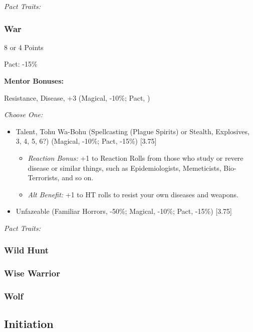 \begin{multicols}{3}
	\textit{Pact Traits:} 
	
	\subsubsection{War}
	\begin{flushright}
		8 or 4 Points
	\end{flushright}
	Pact: -15\%
	
	
	\textbf{Mentor Bonuses:} 
	
	Resistance, Disease, +3 (Magical, -10\%; Pact, )
	
	\textit{Choose One:}
	\begin{itemize}
		\itemsep 0pt
		\item Talent, Tohu Wa-Bohu (Spellcasting (Plague Spirits) or Stealth, Explosives, 3, 4, 5, 6?) (Magical, -10\%; Pact, -15\%) [3.75]
		\begin{itemize}
			\itemsep 0pt
			\item \textit{Reaction Bonus:} +1 to Reaction Rolls from those who study or revere disease or similar things, such as Epidemiologists, Memeticists, Bio-Terrorists, and so on.
			\item \textit{Alt Benefit:} +1 to HT rolls to resist your own diseases and weapons.
		\end{itemize}
		\item Unfazeable (Familiar Horrors, -50\%; Magical, -10\%; Pact, -15\%) [3.75]
	\end{itemize}
	
	\textit{Pact Traits:} 
	
	\subsubsection{Wild Hunt}
	
	\subsubsection{Wise Warrior}
	
	\subsubsection{Wolf}


	
	\subsection{Initiation}
	

\end{multicols}
